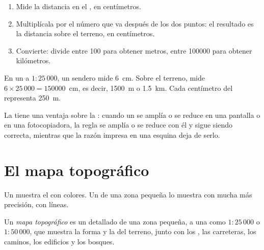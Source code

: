 \begin{method}
\begin{enumerate}
  \item Mide la distancia en el , en centímetros.
  \item Multiplícala por el número que va después de los dos puntos: el
        resultado es la distancia sobre el terreno, en centímetros.
  \item Convierte: divide entre 100 para obtener metros, entre
        \num{100000} para obtener kilómetros.
\end{enumerate}
\end{method}

\begin{example}
En un  a $1 : 25\,000$, un sendero mide \qty{6}{cm}. Sobre el
terreno, mide $6 \times 25\,000 = \num{150000}$~cm, es decir,
\qty{1500}{m} o \qty{1.5}{km}. Cada centímetro del  representa
\qty{250}{m}.
\end{example}

La  tiene una ventaja sobre la : cuando un
 se amplía o se reduce en una pantalla o en una fotocopiadora, la
regla se amplía o se reduce con él y sigue siendo correcta, mientras que la
razón impresa en una esquina deja de serlo.

\section{El mapa topográfico}

Un  muestra el  con colores. Un  de una zona pequeña
lo muestra con mucha más precisión, con líneas.

\begin{definition}\label{def:g9:maps-of-the-earth:topographic-map}
Un \emph{mapa topográfico} es un
 detallado de una zona pequeña, a una  como $1 : 25\,000$ o
$1 : 50\,000$, que muestra la forma y la  del terreno, junto con
los , las carreteras, los caminos, los edificios y los bosques.
\end{definition}

